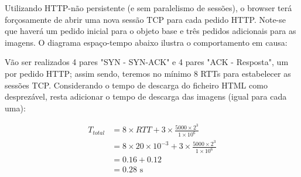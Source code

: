 
\begin{enumerate}[leftmargin=\labelsep]

        Utilizando HTTP-não persistente (e sem paralelismo de sessões), o browser
        terá forçosamente de abrir uma nova sessão TCP para cada pedido HTTP.
        Note-se que haverá um pedido inicial para o objeto base e três pedidos
        adicionais para as imagens. O diagrama espaço-tempo abaixo ilustra o
        comportamento em causa:

        \begin{figure}[H]
          \centering
          
        \end{figure}

        Vão ser realizados 4 pares "SYN - SYN-ACK" e 4 pares "ACK - Resposta",
        um por pedido HTTP; assim sendo, teremos no mínimo 8 RTTs para estabelecer
        as sessões TCP. Considerando o tempo de descarga do ficheiro HTML como
        desprezável, resta adicionar o tempo de descarga das imagens (igual para
        cada uma):

        $$
          \begin{aligned}
            T_{total} & = 8 \times RTT + 3 \times \frac{5000 \times 2^3}{1 \times 10^6}               \\
                      & = 8 \times 20 \times 10^{-3} + 3 \times \frac{5000 \times 2^3}{1 \times 10^6} \\
                      & = 0.16 + 0.12                                                                 \\
                      & = 0.28 \text{ s}
          \end{aligned}
        $$



\end{enumerate}
